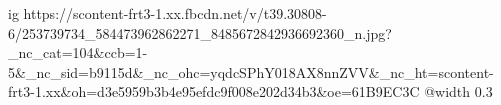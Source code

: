  
 
 
 
 

\ifcmt
  ig https://scontent-frt3-1.xx.fbcdn.net/v/t39.30808-6/253739734_584473962862271_8485672842936692360_n.jpg?_nc_cat=104&ccb=1-5&_nc_sid=b9115d&_nc_ohc=yqdcSPhY018AX8nnZVV&_nc_ht=scontent-frt3-1.xx&oh=d3e5959b3b4e95efdc9f008e202d34b3&oe=61B9EC3C
  @width 0.3
\fi
